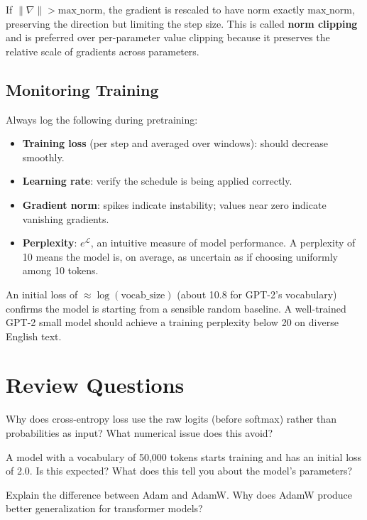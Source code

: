 If $\|\nabla\| > \text{max\_norm}$, the gradient is rescaled to have norm exactly $\text{max\_norm}$, preserving the direction but limiting the step size. This is called \textbf{norm clipping} and is preferred over per-parameter value clipping because it preserves the relative scale of gradients across parameters.

\subsection{Monitoring Training}

Always log the following during pretraining:
\begin{itemize}
  \item \textbf{Training loss} (per step and averaged over windows): should decrease smoothly.
  \item \textbf{Learning rate}: verify the schedule is being applied correctly.
  \item \textbf{Gradient norm}: spikes indicate instability; values near zero indicate vanishing gradients.
  \item \textbf{Perplexity}: $e^{\mathcal{L}}$, an intuitive measure of model performance. A perplexity of 10 means the model is, on average, as uncertain as if choosing uniformly among 10 tokens.
\end{itemize}

An initial loss of $\approx \log(\text{vocab\_size})$ (about 10.8 for GPT-2's vocabulary) confirms the model is starting from a sensible random baseline. A well-trained GPT-2 small model should achieve a training perplexity below 20 on diverse English text.

\section*{Review Questions}

\begin{reviewquestion}[1]
  Why does cross-entropy loss use the raw logits (before softmax) rather than probabilities as input? What numerical issue does this avoid?
\end{reviewquestion}

\begin{reviewquestion}[2]
  A model with a vocabulary of 50,000 tokens starts training and has an initial loss of 2.0. Is this expected? What does this tell you about the model's parameters?
\end{reviewquestion}

\begin{reviewquestion}[3]
  Explain the difference between Adam and AdamW. Why does AdamW produce better generalization for transformer models?
\end{reviewquestion}

